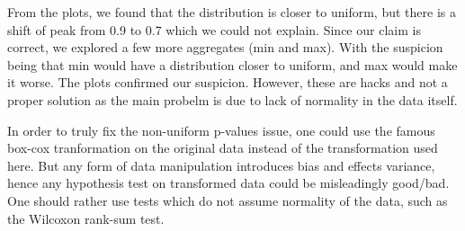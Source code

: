 \documentclass{article}
\begin{document}
From the plots, we found that the distribution is closer to uniform, but there is a shift of peak from 0.9 to 0.7 which we could not explain. Since our claim is correct, we explored a few more aggregates (min and max). With the suspicion being that min would have a distribution closer to uniform, and max would make it worse. The plots confirmed our suspicion. However, these are hacks and not a proper solution as the main probelm is due to lack of normality in the data itself.

In order to truly fix the non-uniform p-values issue, one could use the famous box-cox tranformation on the original data instead of the transformation used here. But any form of data manipulation introduces bias and effects variance, hence any hypothesis test on transformed data could be misleadingly good/bad. One should rather use tests which do not assume normality of the data, such as the Wilcoxon rank-sum test.
\end{document}
